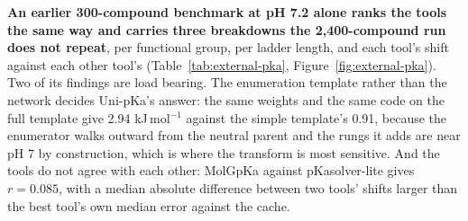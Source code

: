 \textbf{An earlier 300-compound benchmark at pH 7.2 alone ranks the tools the same way and
carries three breakdowns the 2{,}400-compound run does not repeat}, per functional group,
per ladder length, and each tool's shift against each other tool's
(Table~\ref{tab:external-pka}, Figure~\ref{fig:external-pka}). Two of its findings are load
bearing. The enumeration template rather than the network decides Uni-pKa's answer: the same
weights and the same code on the full template give 2.94 kJ\,mol$^{-1}$ against the simple
template's 0.91, because the enumerator walks outward from the neutral parent and the rungs
it adds are near pH 7 by construction, which is where the transform is most sensitive. And
the tools do not agree with each other: MolGpKa against pKasolver-lite gives $r = 0.085$,
with a median absolute difference between two tools' shifts larger than the best tool's own
median error against the cache.



